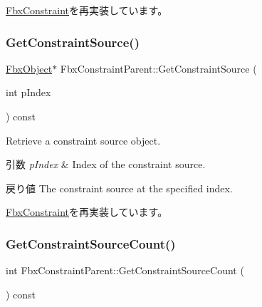 \hyperlink{class_fbx_constraint_a7f587d5db9685b5ee925a85354263edc}{Fbx\+Constraint}を再実装しています。

\mbox{\label{class_fbx_constraint_parent_a687e5a56dfd3882d4ff0c3454a976051}} 
\subsubsection{\texorpdfstring{Get\+Constraint\+Source()}{GetConstraintSource()}}
{\footnotesize\ttfamily \hyperlink{class_fbx_object}{Fbx\+Object}$\ast$ Fbx\+Constraint\+Parent\+::\+Get\+Constraint\+Source (\begin{DoxyParamCaption}\item[{int}]{p\+Index }\end{DoxyParamCaption}) const\hspace{0.3cm}{\ttfamily [virtual]}}

Retrieve a constraint source object. 
\begin{DoxyParams}{引数}
{\em p\+Index} & Index of the constraint source. \\
\hline
\end{DoxyParams}
\begin{DoxyReturn}{戻り値}
The constraint source at the specified index. 
\end{DoxyReturn}


\hyperlink{class_fbx_constraint_a5ff6fe6fc98af1e33e8b297bc1cea007}{Fbx\+Constraint}を再実装しています。

\mbox{\label{class_fbx_constraint_parent_aa7747054ebeee0f94ce907451f648497}} 
\subsubsection{\texorpdfstring{Get\+Constraint\+Source\+Count()}{GetConstraintSourceCount()}}
{\footnotesize\ttfamily int Fbx\+Constraint\+Parent\+::\+Get\+Constraint\+Source\+Count (\begin{DoxyParamCaption}{ }\end{DoxyParamCaption}) const\hspace{0.3cm}{\ttfamily [virtual]}}

